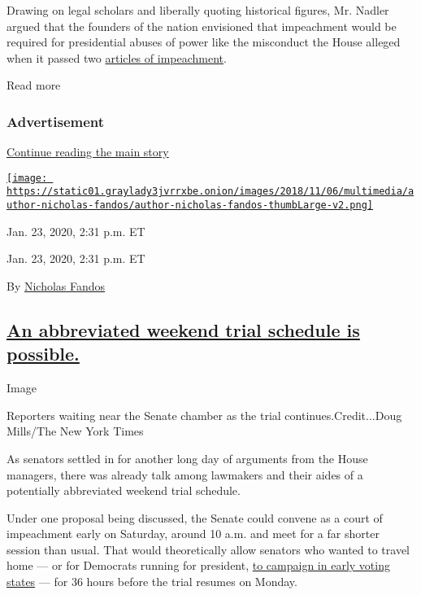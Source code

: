Drawing on legal scholars and liberally quoting historical figures, Mr.
Nadler argued that the founders of the nation envisioned that
impeachment would be required for presidential abuses of power like the
misconduct the House alleged when it passed two
\href{https://www.nytimes3xbfgragh.onion/interactive/2019/12/10/us/politics/articles-impeachment-document-pdf.html}{articles
of impeachment}.

Read more

\hypertarget{advertisement-5}{%
\subsubsection{Advertisement}\label{advertisement-5}}

\protect\hyperlink{after-dfp-ad-mid6}{Continue reading the main story}

\href{https://www.nytimes3xbfgragh.onion/by/nicholas-fandos}{\texttt{[image: https://static01.graylady3jvrrxbe.onion/images/2018/11/06/multimedia/author-nicholas-fandos/author-nicholas-fandos-thumbLarge-v2.png]}}

Jan. 23, 2020, 2:31 p.m. ET

Jan. 23, 2020, 2:31 p.m. ET

By \href{https://www.nytimes3xbfgragh.onion/by/nicholas-fandos}{Nicholas
Fandos}

\hypertarget{an-abbreviated-weekend-trial-schedule-is-possible}{%
\subsection{\texorpdfstring{\protect\hyperlink{an-abbreviated-weekend-trial-schedule-is-possible}{An
abbreviated weekend trial schedule is
possible.}}{An abbreviated weekend trial schedule is possible.}}\label{an-abbreviated-weekend-trial-schedule-is-possible}}

Image

Reporters waiting near the Senate chamber as the trial
continues.Credit...Doug Mills/The New York Times

As senators settled in for another long day of arguments from the House
managers, there was already talk among lawmakers and their aides of a
potentially abbreviated weekend trial schedule.

Under one proposal being discussed, the Senate could convene as a court
of impeachment early on Saturday, around 10 a.m. and meet for a far
shorter session than usual. That would theoretically allow senators who
wanted to travel home --- or for Democrats running for president,
\href{https://www.nytimes3xbfgragh.onion/2020/01/22/us/politics/trump-impeachment-democratic-candidates.html}{to
campaign in early voting states} --- for 36 hours before the trial
resumes on Monday.

